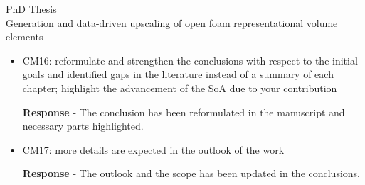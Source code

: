 \documentclass[12pt]{letter}
\begin{document}
\begin{letter}{PhD Thesis\\
Generation and data-driven upscaling of open foam representational volume elements}
\begin{itemize}

\item CM16: reformulate and strengthen the conclusions with respect to the initial goals
and identified gaps in the literature instead of a summary of each chapter; highlight
the advancement of the SoA due to your contribution

\textbf{Response} - The conclusion has been reformulated in the manuscript and necessary parts highlighted.

\item CM17: more details are expected in the outlook of the work

\textbf{Response} - The outlook and the scope has been updated in the conclusions.
\end{itemize}

\end{letter}
\end{document}
